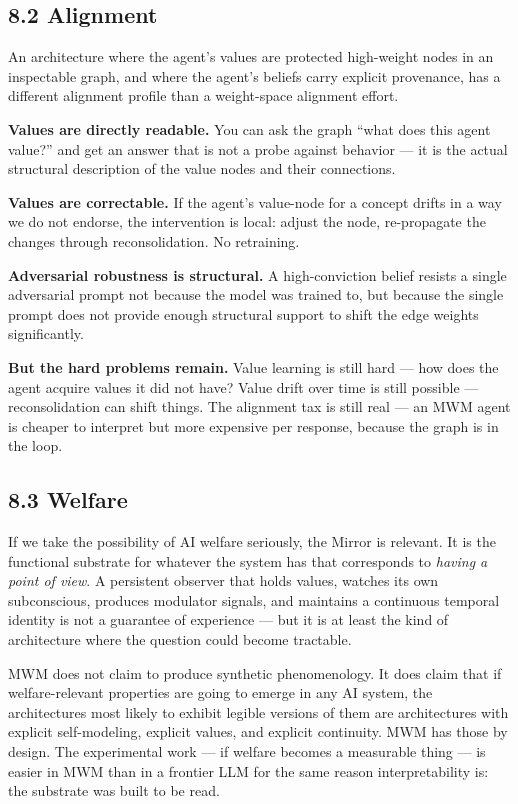\documentclass[12pt]{article}
\begin{document}
\subsection{8.2 Alignment}\label{alignment}

An architecture where the agent's values are protected high-weight nodes in an inspectable graph, and where the agent's beliefs carry explicit provenance, has a different alignment profile than a weight-space alignment effort.

\textbf{Values are directly readable.} You can ask the graph ``what does this agent value?'' and get an answer that is not a probe against behavior --- it is the actual structural description of the value nodes and their connections.

\textbf{Values are correctable.} If the agent's value-node for a concept drifts in a way we do not endorse, the intervention is local: adjust the node, re-propagate the changes through reconsolidation. No retraining.

\textbf{Adversarial robustness is structural.} A high-conviction belief resists a single adversarial prompt not because the model was trained to, but because the single prompt does not provide enough structural support to shift the edge weights significantly.

\textbf{But the hard problems remain.} Value learning is still hard --- how does the agent acquire values it did not have? Value drift over time is still possible --- reconsolidation can shift things. The alignment tax is still real --- an MWM agent is cheaper to interpret but more expensive per response, because the graph is in the loop.

\subsection{8.3 Welfare}\label{welfare}

If we take the possibility of AI welfare seriously, the Mirror is relevant. It is the functional substrate for whatever the system has that corresponds to \emph{having a point of view}. A persistent observer that holds values, watches its own subconscious, produces modulator signals, and maintains a continuous temporal identity is not a guarantee of experience --- but it is at least the kind of architecture where the question could become tractable.

MWM does not claim to produce synthetic phenomenology. It does claim that if welfare-relevant properties are going to emerge in any AI system, the architectures most likely to exhibit legible versions of them are architectures with explicit self-modeling, explicit values, and explicit continuity. MWM has those by design. The experimental work --- if welfare becomes a measurable thing --- is easier in MWM than in a frontier LLM for the same reason interpretability is: the substrate was built to be read.
\end{document}
